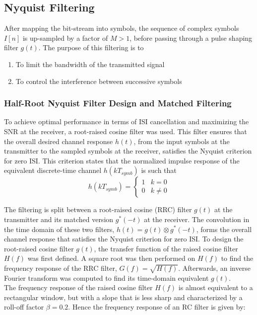 \subsection{Nyquist Filtering}
After mapping the bit-stream into symbols, the sequence of complex symbols $I[n]$ is up-sampled by a factor of $M > 1$, before passing through a pulse shaping filter $g(t)$. The purpose of this filtering is to
\begin{enumerate}
	\item To limit the bandwidth of the transmitted signal
	\item To control the interference between successive symbols
\end{enumerate}
\subsubsection{Half-Root Nyquist Filter Design and Matched Filtering}
To achieve optimal performance in terms of ISI cancellation and maximizing the SNR at the receiver, a root-raised cosine filter was used. This filter ensures that the overall desired channel response $h(t)$, from the input symbols at the transmitter to the sampled symbols at the receiver, satisfies the Nyquist criterion for zero ISI. This criterion states that the normalized impulse response of the equivalent discrete-time channel $h(kT_{symb})$  is such that
\begin{equation}
	h(kT_{symb}) = \begin{cases}
		1 & k=0 \\
		0 & k \neq 0
	\end{cases}
\end{equation}

The filtering is split between a root-raised cosine (RRC) filter $g(t)$ at the transmitter and its matched version $g^*(-t)$ at the receiver. The convolution in the time domain of these two filters, $h(t) = g(t) \otimes g^*(-t)$, forms the overall channel response that satisfies the Nyquist criterion for zero ISI.
To design the root-raised cosine filter $g(t)$, the transfer function of the raised cosine filter $H(f)$ was first defined. A square root was then performed on $H(f)$ to find the frequency response of the RRC filter, $G(f) = \sqrt{H(f)}$. Afterwards, an inverse Fourier transform was computed to find its time-domain equivalent $g(t)$.\\

The frequency response of the raised cosine filter $H(f)$ is almost equivalent to a rectangular window, but with a slope that is less sharp and characterized by a roll-off factor $\beta = 0.2$. Hence the frequency response of an RC filter is given by:

